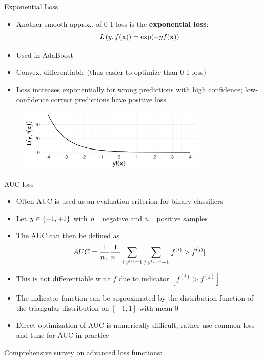 \documentclass[11pt,compress,t,notes=noshow, xcolor=table]{beamer}
\begin{document}
\begin{vbframe}{Exponential Loss}


\begin{itemize}
\item Another smooth 
approx. of 0-1-loss is the \textbf{exponential loss}:
$$\Lxy = \exp(-y\fx)$$ 
\item Used in AdaBoost
\item Convex, differentiable (thus easier to optimize than 0-1-loss)
\item Loss increases exponentially for wrong predictions with high confidence; low-confidence correct predictions have positive loss
\end{itemize}


\begin{figure}
\includegraphics[width = 0.8\textwidth]{figure/exponential.png}
\end{figure}

\end{vbframe}

\begin{vbframe}{AUC-loss}

\begin{itemize}
\item Often AUC is used as an evaluation criterion for binary classifiers
\item Let $y \in \setmp$ with $\nn$ negative and $\np$ positive samples %
\item The AUC can then be defined as
$$AUC = \frac{1}{\np} \frac{1}{\nn} \sum_{i: \yi = 1} \sum_{j: \yi[j] = -1} [f^{(i)} > f^{(j)}]$$
\item This is not differentiable w.r.t $f$ due to indicator $[f^{(i)} > f^{(j)}]$
\item The indicator function can be approximated by the distribution function of the triangular distribution on $[-1, 1]$ with mean $0$
\item Direct optimization of AUC is numerically difficult, rather use common loss and tune for AUC in practice

\end{itemize}

Comprehensive survey on advanced loss functions: 

\end{vbframe}





\endlecture
\end{document}
